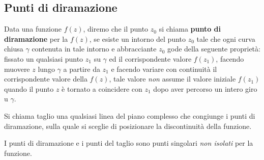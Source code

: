 \subsection*{Punti di diramazione}
\begin{definition}
Data una funzione $f(z)$, diremo che il punto $z_0$ si chiama \textbf{punto di diramazione} per la $f(z)$, se esiste un intorno del punto $z_0$ tale che ogni curva chiusa $\gamma$ contenuta in tale intorno e abbracciante $z_0$ gode della seguente proprietà: fissato un qualsiasi punto $z_1$ su $\gamma$ ed il corrispondente valore $f(z_1)$, facendo muovere $z$ lungo $\gamma$ a partire da $z_1$ e facendo variare con continuità il corrispondente valore della $f(z)$, tale valore \textit{non} assume il valore iniziale $f(z_1)$ quando il punto $z$ è tornato a coincidere con $z_1$ dopo aver percorso un intero giro u $\gamma$.
\end{definition}
\begin{definition}
Si chiama taglio una qualsiasi linea del piano complesso che congiunge i punti di diramazione, sulla quale si sceglie di posizionare la discontinuità della funzione.
\end{definition}
I punti di diramazione e i punti del taglio sono punti singolari \textit{non isolati} per la funzione.